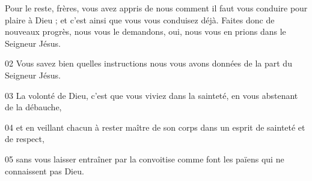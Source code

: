 Pour le reste, frères, vous avez appris de nous comment il faut vous conduire pour plaire à Dieu ; et c’est ainsi que vous vous conduisez déjà. Faites donc de nouveaux progrès, nous vous le demandons, oui, nous vous en prions dans le Seigneur Jésus.

02 Vous savez bien quelles instructions nous vous avons données de la part du Seigneur Jésus.

03 La volonté de Dieu, c’est que vous viviez dans la sainteté, en vous abstenant de la débauche,

04 et en veillant chacun à rester maître de son corps dans un esprit de sainteté et de respect,

05 sans vous laisser entraîner par la convoitise comme font les païens qui ne connaissent pas Dieu.
